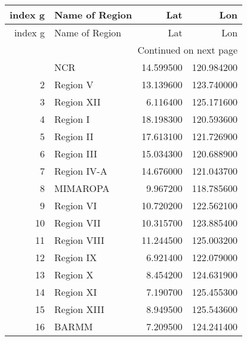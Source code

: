 \begin{longtable}{rlrr}
\toprule
index g & Name of Region & Lat & Lon \\
\midrule
\endfirsthead
\toprule
index g & Name of Region & Lat & Lon \\
\midrule
\endhead
\midrule
\multicolumn{4}{r}{Continued on next page} \\
\midrule
\endfoot
\bottomrule
\endlastfoot
1 & NCR & 14.599500 & 120.984200 \\
2 & Region V & 13.139600 & 123.740000 \\
3 & Region XII & 6.116400 & 125.171600 \\
4 & Region I & 18.198300 & 120.593600 \\
5 & Region II & 17.613100 & 121.726900 \\
6 & Region III & 15.034300 & 120.688900 \\
7 & Region IV-A & 14.676000 & 121.043700 \\
8 & MIMAROPA & 9.967200 & 118.785600 \\
9 & Region VI & 10.720200 & 122.562100 \\
10 & Region VII & 10.315700 & 123.885400 \\
11 & Region VIII & 11.244500 & 125.003200 \\
12 & Region IX & 6.921400 & 122.079000 \\
13 & Region X & 8.454200 & 124.631900 \\
14 & Region XI & 7.190700 & 125.455300 \\
15 & Region XIII & 8.949500 & 125.543600 \\
16 & BARMM & 7.209500 & 124.241400 \\
\end{longtable}
